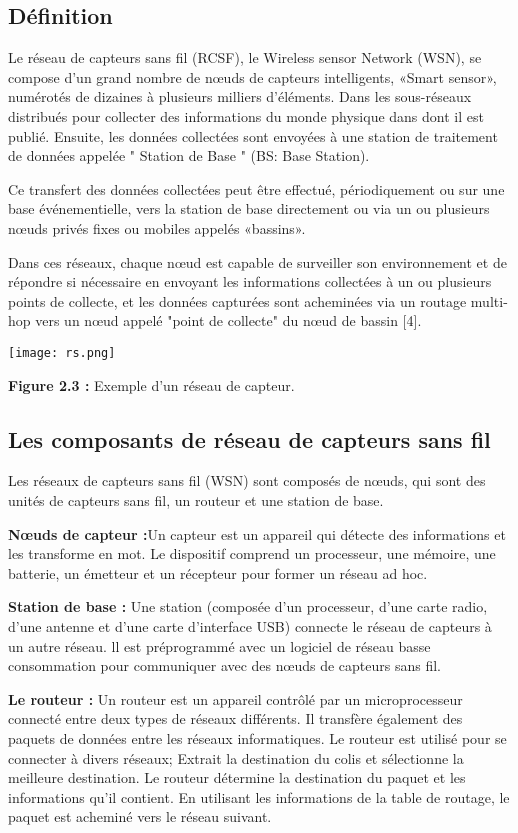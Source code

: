 \documentclass[paper=a4, fontsize=11pt]{scrartcl}
\numberwithin{equation}{section}		%
\numberwithin{figure}{section}			%
\numberwithin{table}{section}				%
\begin{document}
\subsection{Définition}
Le réseau de capteurs sans fil (RCSF), le Wireless sensor Network (WSN), se compose d'un
grand nombre de nœuds de capteurs intelligents, «Smart sensor», numérotés de dizaines à
plusieurs milliers d'éléments. Dans les sous-réseaux distribués pour collecter des
informations du monde physique dans dont il est publié. Ensuite, les données collectées sont
envoyées à une station de traitement de données appelée " Station de Base " (BS: Base
Station).\par
Ce transfert des données collectées peut être effectué, périodiquement ou sur une base
événementielle, vers la station de base directement ou via un ou plusieurs nœuds privés
fixes ou mobiles appelés «bassins».\par
Dans ces réseaux, chaque nœud est capable de surveiller son environnement et de répondre
si nécessaire en envoyant les informations collectées à un ou plusieurs points de collecte, et
les données capturées sont acheminées via un routage multi-hop vers un nœud appelé "point
de collecte" du nœud de bassin [4].\par
\begin{center}
    \texttt{[image: rs.png]} \par
    \caption{  \textbf{Figure 2.3 :} Exemple d’un réseau de capteur. } \par
    \end{center}
\subsection{Les composants de réseau de capteurs sans fil}
Les réseaux de capteurs sans fil (WSN) sont composés de nœuds, qui sont des unités
de capteurs sans fil, un routeur et une station de base.\par
\textbf{ Nœuds de capteur :}Un capteur est un appareil qui détecte des informations et les transforme en mot.
Le dispositif comprend un processeur, une mémoire, une batterie, un émetteur et un
récepteur pour former un réseau ad hoc.\par
 \textbf{Station de base :}
Une station (composée d'un processeur, d'une carte radio, d'une antenne et d'une
carte d'interface USB) connecte le réseau de capteurs à un autre réseau. ll est
préprogrammé avec un logiciel de réseau basse consommation pour communiquer
avec des nœuds de capteurs sans fil.\par
 \textbf{Le routeur :}
Un routeur est un appareil contrôlé par un microprocesseur connecté entre deux
types de réseaux différents. Il transfère également des paquets de données entre les
réseaux informatiques. Le routeur est utilisé pour se connecter à divers réseaux;
Extrait la destination du colis et sélectionne la meilleure destination.
Le routeur détermine la destination du paquet et les informations qu'il contient.
En utilisant les informations de la table de routage, le paquet est acheminé vers le
réseau suivant.\par 
\end{document}
